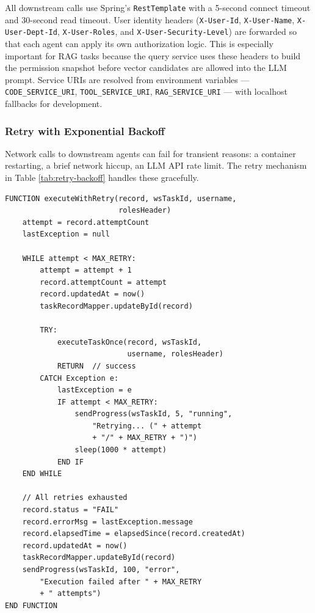 All downstream calls use Spring's \texttt{RestTemplate} with a 5-second connect timeout and 30-second read timeout. User identity headers (\texttt{X-User-Id}, \texttt{X-User-Name}, \texttt{X-User-Dept-Id}, \texttt{X-User-Roles}, and \texttt{X-User-Security-Level}) are forwarded so that each agent can apply its own authorization logic. This is especially important for RAG tasks because the query service uses these headers to build the permission snapshot before vector candidates are allowed into the LLM prompt. Service URIs are resolved from environment variables --- \texttt{CODE\_SERVICE\_URI}, \texttt{TOOL\_SERVICE\_URI}, \texttt{RAG\_SERVICE\_URI} --- with localhost fallbacks for development.

\subsubsection{Retry with Exponential Backoff}

Network calls to downstream agents can fail for transient reasons: a container restarting, a brief network hiccup, an LLM API rate limit. The retry mechanism in Table \ref{tab:retry-backoff} handles these gracefully.

\vspace{3mm}
\begin{table}[H]
\small\singlespacing
\centering
\caption{Pseudocode --- executeWithRetry() Exponential Backoff Loop}
\label{tab:retry-backoff}
\vspace{2mm}

\begin{lstlisting}
FUNCTION executeWithRetry(record, wsTaskId, username,
                          rolesHeader)
    attempt = record.attemptCount
    lastException = null

    WHILE attempt < MAX_RETRY:
        attempt = attempt + 1
        record.attemptCount = attempt
        record.updatedAt = now()
        taskRecordMapper.updateById(record)

        TRY:
            executeTaskOnce(record, wsTaskId,
                            username, rolesHeader)
            RETURN  // success
        CATCH Exception e:
            lastException = e
            IF attempt < MAX_RETRY:
                sendProgress(wsTaskId, 5, "running",
                    "Retrying... (" + attempt
                    + "/" + MAX_RETRY + ")")
                sleep(1000 * attempt)
            END IF
    END WHILE

    // All retries exhausted
    record.status = "FAIL"
    record.errorMsg = lastException.message
    record.elapsedTime = elapsedSince(record.createdAt)
    record.updatedAt = now()
    taskRecordMapper.updateById(record)
    sendProgress(wsTaskId, 100, "error",
        "Execution failed after " + MAX_RETRY
        + " attempts")
END FUNCTION
\end{lstlisting}
\end{table}

